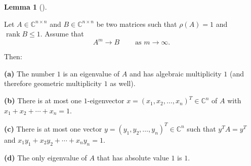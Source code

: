 \documentclass[numbers=enddot,12pt,final,onecolumn,notitlepage]{scrartcl}%
\numberwithin{exer}{subsection}
\theoremstyle{definition}
\newtheorem{lem}[theo]{Lemma}
\newenvironment{lemma}[1][]
{\begin{lem}[#1]\begin{leftbar}}
{\end{leftbar}\end{lem}}
\begin{document}
\begin{lemma}
\label{lem.posmat.uniques}Let $A\in\mathbb{C}^{n\times n}$ and $B\in
\mathbb{C}^{n\times n}$ be two matrices such that $\rho\left(  A\right)  =1$
and $\operatorname*{rank}B\leq1$. Assume that%
\begin{equation}
A^{m}\rightarrow B\ \ \ \ \ \ \ \ \ \ \text{as }m\rightarrow\infty.
\label{eq.lem.posmat.uniques.ass}%
\end{equation}


Then: \medskip

\textbf{(a)} The number $1$ is an eigenvalue of $A$ and has algebraic
multiplicity $1$ (and therefore geometric multiplicity $1$ as well). \medskip

\textbf{(b)} There is at most one $1$-eigenvector $x=\left(  x_{1}%
,x_{2},\ldots,x_{n}\right)  ^{T}\in\mathbb{C}^{n}$ of $A$ with $x_{1}%
+x_{2}+\cdots+x_{n}=1$. \medskip

\textbf{(c)} There is at most one vector $y=\left(  y_{1},y_{2},\ldots
,y_{n}\right)  ^{T}\in\mathbb{C}^{n}$ such that $y^{T}A=y^{T}$ and $x_{1}%
y_{1}+x_{2}y_{2}+\cdots+x_{n}y_{n}=1$. \medskip

\textbf{(d)} The only eigenvalue of $A$ that has absolute value $1$ is $1$.
\end{lemma}
\end{document}
